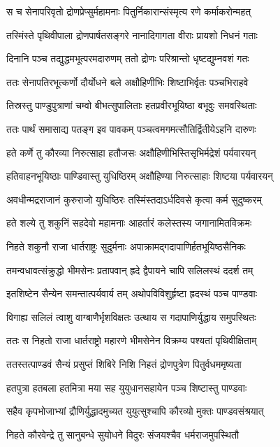 \twolineshloka
{स च सेनापरिवृतो द्रोणप्रेप्सुर्महामनाः}
{पितुर्निकारान्संस्मृत्य रणे कर्माकरोन्महत्}


\twolineshloka
{तस्मिंस्ते पृथिवीपाला द्रोणपार्षतसङ्गरे}
{नानादिगागता वीराः प्रायशो निधनं गताः}


\twolineshloka
{दिनानि पञ्च तद्युद्धमभूत्परमदारुणम्}
{ततो द्रोणः परिश्रान्तो धृष्टद्युम्नवशं गतः}


\twolineshloka
{ततः सेनापतिरभूत्कर्णो दौर्योधने बले}
{अक्षौहिणीभिः शिष्टाभिर्वृतः पञ्चभिराहवे}


\twolineshloka
{तिस्रस्तु पाण्डुपुत्राणां चम्वो बीभत्सुपालिताः}
{हतप्रवीरभूयिष्ठा बभूवुः समवस्थिताः}


\twolineshloka
{ततः पार्थं समासाद्य पतङ्ग इव पावकम्}
{पञ्चत्वमगमत्सौतिर्द्वितीयेऽहनि दारुणः}


\twolineshloka
{हते कर्णे तु कौरव्या निरुत्साहा हतौजसः}
{अक्षौहिणीभिस्तिसृभिर्मद्रेशं पर्यवारयन्}


\twolineshloka
{हतिवाहनभूयिष्ठाः पाण्डिवास्तु युधिष्ठिरम्}
{अक्षौहिण्या निरुत्साहाः शिष्टया पर्यवारयन्}


\twolineshloka
{अवधीन्मद्रराजानं कुरुराजो युधिष्ठिरः}
{तस्मिंस्तदाऽर्धदिवसे कृत्वा कर्म सुदुष्करम्}


\twolineshloka
{हते शल्ये तु शकुनिं सहदेवो महामनाः}
{आहर्तारं कलेस्तस्य जगानामितविक्रमः}


\twolineshloka
{निहते शकुनौ राजा धार्तराष्ट्रः सुदुर्मनाः}
{अपाक्रामद्गदापाणिर्हतभूयिष्ठसैनिकः}


\twolineshloka
{तमन्वधावत्संक्रुद्धो भीमसेनः प्रतापवान्}
{ह्रदे द्वैपायने चापि सलिलस्थं ददर्श तम्}


\twolineshloka
{इतशिष्टेन सैन्येन समन्तात्पर्यवार्य तम्}
{अथोपविविशुर्हृष्टा ह्रदस्थं पञ्च पाण्डवाः}


\twolineshloka
{विगाह्य सलिलं त्वाशु वाग्बाणैर्भृशविक्षतः}
{उत्थाय स गदापाणिर्युद्धाय समुपस्थितः}


\twolineshloka
{ततः स निहतो राजा धार्तराष्ट्रो महारणे}
{भीमसेनेन विक्रम्य पश्यतां पृथिवीक्षिताम्}


\twolineshloka
{ततस्तत्पाण्डवं सैन्यं प्रसुप्तं शिबिरे निशि}
{निहतं द्रोणपुत्रेण पितुर्वधममृष्यता}


\twolineshloka
{हतपुत्रा हतबला हतमित्रा मया सह}
{युयुधानसहायेन पञ्च शिष्टास्तु पाण्डवाः}


\twolineshloka
{सहैव कृपभोजाभ्यां द्रौणिर्युद्धादमुच्यत}
{युयुत्सुश्चापि कौरव्यो मुक्तः पाण्डवसंश्रयात्}


\twolineshloka
{निहते कौरवेन्द्रे तु सानुबन्धे सुयोधने}
{विदुरः संजयश्चैव धर्मराजमुपस्थितौ}


